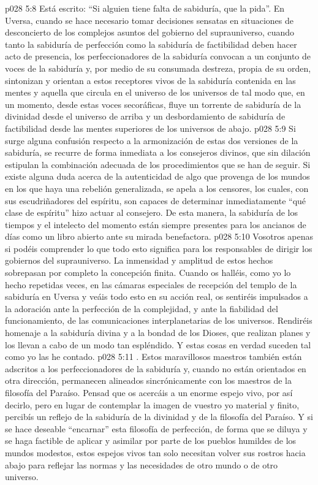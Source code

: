 \vs p028 5:8 Está escrito: “Si alguien tiene falta de sabiduría, que la pida”. En Uversa, cuando se hace necesario tomar decisiones sensatas en situaciones de desconcierto de los complejos asuntos del gobierno del suprauniverso, cuando tanto la sabiduría de perfección como la sabiduría de factibilidad deben hacer acto de presencia, los perfeccionadores de la sabiduría convocan a un conjunto de voces de la sabiduría y, por medio de su consumada destreza, propia de su orden, sintonizan y orientan a estos receptores vivos de la sabiduría contenida en las mentes y aquella que circula en el universo de los universos de tal modo que, en un momento, desde estas voces secoráficas, fluye un torrente de sabiduría de la divinidad desde el universo de arriba y un desbordamiento de sabiduría de factibilidad desde las mentes superiores de los universos de abajo.
\vs p028 5:9 Si surge alguna confusión respecto a la armonización de estas dos versiones de la sabiduría, se recurre de forma inmediata a los consejeros divinos, que sin dilación estipulan la combinación adecuada de los procedimientos que se han de seguir. Si existe alguna duda acerca de la autenticidad de algo que provenga de los mundos en los que haya una rebelión generalizada, se apela a los censores, los cuales, con sus escudriñadores del espíritu, son capaces de determinar inmediatamente “qué clase de espíritu” hizo actuar al consejero. De esta manera, la sabiduría de los tiempos y el intelecto del momento están siempre presentes para los ancianos de días como un libro abierto ante su mirada benefactora.
\vs p028 5:10 Vosotros apenas si podéis comprender lo que todo esto significa para los responsables de dirigir los gobiernos del suprauniverso. La inmensidad y amplitud de estos hechos sobrepasan por completo la concepción finita. Cuando os halléis, como yo lo hecho repetidas veces, en las cámaras especiales de recepción del templo de la sabiduría en Uversa y veáis todo esto en su acción real, os sentiréis impulsados a la adoración ante la perfección de la complejidad, y ante la fiabilidad del funcionamiento, de las comunicaciones interplanetarias de los universos. Rendiréis homenaje a la sabiduría divina y a la bondad de los Dioses, que realizan planes y los llevan a cabo de un modo tan espléndido. Y estas cosas en verdad suceden tal como yo las he contado.
\vs p028 5:11 . Estos maravillosos maestros también están adscritos a los perfeccionadores de la sabiduría y, cuando no están orientados en otra dirección, permanecen alineados sincrónicamente con los maestros de la filosofía del Paraíso. Pensad que os acercáis a un enorme espejo vivo, por así decirlo, pero en lugar de contemplar la imagen de vuestro yo material y finito, percibís un reflejo de la sabiduría de la divinidad y de la filosofía del Paraíso. Y si se hace deseable “encarnar” esta filosofía de perfección, de forma que se diluya y se haga factible de aplicar y asimilar por parte de los pueblos humildes de los mundos modestos, estos espejos vivos tan solo necesitan volver sus rostros hacia abajo para reflejar las normas y las necesidades de otro mundo o de otro universo.
